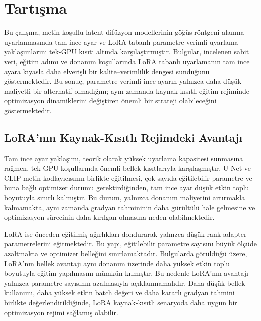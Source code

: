 \documentclass[11pt]{article}
\begin{document}
\section{Tartışma}
\label{sec:discussion}

Bu çalışma, metin-koşullu latent difüzyon modellerinin göğüs röntgeni alanına
uyarlanmasında tam ince ayar ve LoRA tabanlı parametre-verimli uyarlama
yaklaşımlarını tek-GPU kısıtı altında karşılaştırmıştır. Bulgular, incelenen
sabit veri, eğitim adımı ve donanım koşullarında LoRA tabanlı uyarlamanın tam
ince ayara kıyasla daha elverişli bir kalite--verimlilik dengesi sunduğunu
göstermektedir. Bu sonuç, parametre-verimli ince ayarın yalnızca daha düşük
maliyetli bir alternatif olmadığını; aynı zamanda kaynak-kısıtlı eğitim
rejiminde optimizasyon dinamiklerini değiştiren önemli bir strateji
olabileceğini göstermektedir.

\subsection{LoRA'nın Kaynak-Kısıtlı Rejimdeki Avantajı}

Tam ince ayar yaklaşımı, teorik olarak yüksek uyarlama kapasitesi sunmasına
rağmen, tek-GPU koşullarında önemli bellek kısıtlarıyla karşılaşmıştır. U-Net ve
CLIP metin kodlayıcısının birlikte eğitilmesi, çok sayıda eğitilebilir parametre
ve buna bağlı optimizer durumu gerektirdiğinden, tam ince ayar düşük etkin toplu
boyutuyla sınırlı kalmıştır. Bu durum, yalnızca donanım maliyetini artırmakla
kalmamakta, aynı zamanda gradyan tahmininin daha gürültülü hale gelmesine ve
optimizasyon sürecinin daha kırılgan olmasına neden olabilmektedir.

LoRA ise önceden eğitilmiş ağırlıkları dondurarak yalnızca düşük-rank adapter
parametrelerini eğitmektedir. Bu yapı, eğitilebilir parametre sayısını büyük
ölçüde azaltmakta ve optimizer belleğini sınırlamaktadır. Bulgularda görüldüğü
üzere, LoRA'nın bellek avantajı aynı donanım üzerinde daha yüksek etkin toplu
boyutuyla eğitim yapılmasını mümkün kılmıştır. Bu nedenle LoRA'nın avantajı
yalnızca parametre sayısının azalmasıyla açıklanmamalıdır. Daha düşük bellek
kullanımı, daha yüksek etkin batch değeri ve daha kararlı gradyan tahmini
birlikte değerlendirildiğinde, LoRA kaynak-kısıtlı senaryoda daha uygun bir
optimizasyon rejimi sağlamış olabilir.
\end{document}
